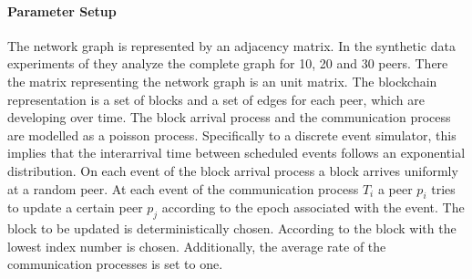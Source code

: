 \paragraph{Parameter Setup}
The network graph is represented by an adjacency matrix. In the synthetic data experiments of \gopalan  they analyze the complete graph for 10, 20 and 30 peers. There the matrix representing the network graph is an unit matrix.
The blockchain representation is a set of blocks and a set of edges for each peer, which are developing over time.
The block arrival process and the communication process are modelled as a poisson process. Specifically to a discrete event simulator, this implies that the interarrival time between scheduled events follows an exponential distribution. On each event of the block arrival process a block arrives uniformly at a random peer. At each event of the communication process $T_i$ a peer $p_i$ tries to update a certain peer $p_j$ according to the epoch associated with the event.
The block to be updated is deterministically chosen. According to \gopalan the block with the lowest index number is chosen. Additionally, the average rate of the communication processes is set to one.

